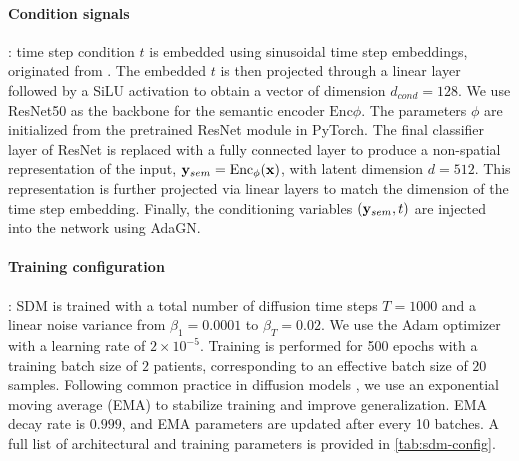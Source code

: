 \paragraph{Condition signals}: time step condition $t$ is embedded using sinusoidal time step embeddings, originated from \cite{vaswani2023attentionneed}. The embedded $t$ is then projected through a linear layer followed by a SiLU activation to obtain a vector of dimension $d_{cond} = 128$. We use ResNet50 as the backbone for the semantic encoder $\mathrm{Enc}{\phi}$. The parameters $\phi$ are initialized from the pretrained ResNet module in PyTorch. The final classifier layer of ResNet is replaced with a fully connected layer to produce a non-spatial representation of the input, ${\mathbf{y}}_{sem} = \mathrm{Enc}_{\phi}({\mathbf{x}})$, with latent dimension $d = 512$. This representation is further projected via linear layers to match the dimension of the time step embedding. Finally, the conditioning variables $({\mathbf{y}}_{sem}, t)$ are injected into the network using AdaGN. 
\paragraph{Training configuration}: \ac{SDM} is trained with a total number of diffusion time steps $T = 1000$ and a linear noise variance from $\beta_1 = 0.0001$ to $\beta_T = 0.02$. We use the Adam optimizer with a learning rate of $2 \times 10^{-5}$. Training is performed for 500 epochs with a training batch size of $2$ patients, corresponding to an effective batch size of $20$ samples. Following common practice in diffusion models \cite{lozuponeLDAE2025, rombachLDM}, we use an exponential moving average (EMA) to stabilize training and improve generalization. EMA decay rate is $0.999$, and EMA parameters are updated after every 10 batches. A full list of architectural and training parameters is provided in \cref{tab:sdm-config}.

